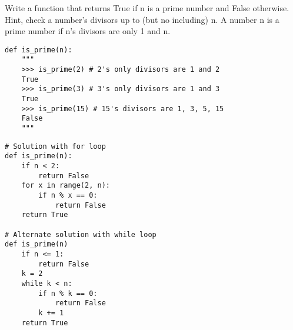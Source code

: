 \begin{blocksection}
\question Write a function that returns True if n is a prime number and False otherwise. Hint, check a number's divisors up to (but no including) n. A number n is a prime number if n's divisors are only 1 and n. 

\begin{lstlisting}
def is_prime(n):
    """
    >>> is_prime(2) # 2's only divisors are 1 and 2
    True
    >>> is_prime(3) # 3's only divisors are 1 and 3
    True
    >>> is_prime(15) # 15's divisors are 1, 3, 5, 15
    False
    """

\end{lstlisting}

\begin{solution}[1.5in]
\begin{lstlisting}
# Solution with for loop
def is_prime(n):
    if n < 2:
        return False
    for x in range(2, n):
        if n % x == 0:
            return False
    return True

# Alternate solution with while loop
def is_prime(n)
    if n <= 1:
        return False
    k = 2
    while k < n:
        if n % k == 0:             
            return False
        k += 1
    return True
\end{lstlisting}
\end{solution}
\end{blocksection}
